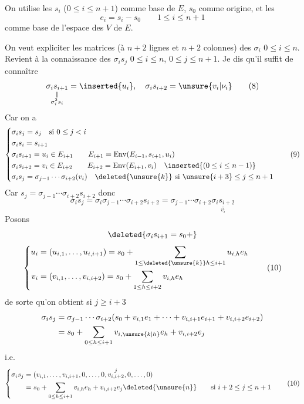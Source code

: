 On utilise les $s_i$ ($0\leq i\leq n+1$) comme base de $E$,  $s_0$ comme origine, et les
\[
e_i=s_i-s_0\qquad1\leq i\leq n+1\tag*{(7)}
\]
comme base de l'espace des  $V$ de $E$.

On veut expliciter les matrices (à $n+2$ lignes et $n+2$ colonnes) des $\sigma_i$ $0\leq i\leq n$. Revient à la connaissance des $\sigma_is_j$ $0\leq i\leq n$, $0\leq j\leq n+1$. Je dis qu'il suffit de connaître
\[
\underset{\substack{\Vert\\\sigma_i^2s_i}}{\sigma_is_{i+1}}=\inserted{u_i},\quad\sigma_is_{i+2}=\unsure{v_i|\nu_i}\tag*{(8)}
\]
Car on a 
\[
\left\{\begin{aligned}
&\sigma_is_j=s_j\quad\text{si }0\leq j<i\\
&\sigma_is_i=s_{i+1}\\
&\sigma_is_{i+1}=u_i\in E_{i+1}\qquad E_{i+1}=\mathrm{Env}(E_{i-1},s_{i+1},u_i)\\
&\sigma_is_{i+2}=v_i\in E_{i+2}\qquad E_{i+2}=\mathrm{Env}(E_{i+1},v_i)\quad\inserted{(0\leq i\leq n-1)}\\
&\sigma_is_j=\sigma_{j-1}\cdots\sigma_{i+2}(v_i)\quad\deleted{\unsure{k}}\ \text{si }\unsure{i+3}\leq j\leq n+1
\end{aligned}\right.\tag*{(9)}
\]
Car $s_j=\sigma_{j-1}\cdots\sigma_{i+2}s_{i+2}$ donc
\[
\sigma_is_j=\sigma_i\sigma_{j-1}\cdots\sigma_{i+2}s_{i+2}=\sigma_{j-1}\cdots\sigma_{i+2}\underset{v_i}{\underline{\sigma_is_{i+2}}}
\]
Posons
\[
\deleted{\sigma_is_{i+1}=s_0+}
\]
\[
\left\{\begin{aligned}
u_i&=(u_{i,1},\ldots,u_{i,i+1})=s_0+\sum_{1\leq\deleted{\unsure{k}}h\leq i+1}u_{i,h}e_h\\
v_i&=(v_{i,1},\ldots,v_{i,i+2})=s_0+\sum_{1\leq h\leq i+2}v_{i,h}e_h
\end{aligned}\right.\tag*{(10)}
\]
de sorte qu'on obtient si $j\geq i+3$
\[
\begin{aligned}
\sigma_is_j&=\sigma_{j-1}\cdots\sigma_{i+2}(s_0+v_{i,1}e_1+\cdots+v_{i,i+1}e_{i+1}+v_{i,i+2}e_{i+2})\\
&=s_0+\sum_{0\leq h\leq i+1}v_{i,\unsure{k|h}}e_h+v_{i,i+2}e_j
\end{aligned}
\]
i.e.
\[
\left\{\begin{aligned}
\sigma_is_j&=(v_{i,1},\ldots,v_{i,i+1},0,\ldots,0,\overset{j}{v_{i,i+2}},0,\ldots,0)\\
&=s_0+\sum_{0\leq h\leq i+1}v_{i,h}e_h+v_{i,i+2}e_j\deleted{\unsure{n}}\qquad\text{si }i+2\leq j\leq n+1
\end{aligned}\right.\tag*{(10)}
\]
